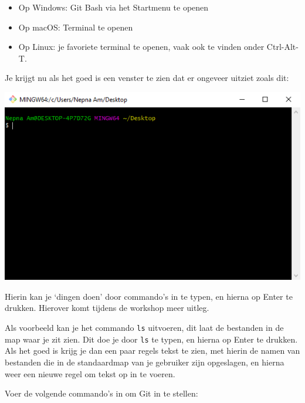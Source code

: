 \documentclass[a4paper]{extarticle}
\begin{document}
\begin{itemize}
	\item Op Windows: Git Bash via het Startmenu te openen
	\item Op macOS: Terminal te openen
	\item Op Linux: je favoriete terminal te openen, vaak ook te vinden onder Ctrl-Alt-T.
\end{itemize}

Je krijgt nu als het goed is een venster te zien dat er ongeveer uitziet zoals dit:
\begin{center}
	\includegraphics[width=0.75\linewidth]{terminal}
\end{center}

Hierin kan je `dingen doen' door commando's in te typen, en hierna op Enter te drukken. Hierover komt tijdens de
workshop meer uitleg.

Als voorbeeld kan je het commando \texttt{ls} uitvoeren, dit laat de bestanden in de map waar je zit zien. Dit doe je
door \texttt{ls} te typen, en hierna op Enter te drukken. Als het goed is krijg je dan een paar regels tekst te zien,
met hierin de namen van bestanden die in de standaardmap van je gebruiker zijn opgeslagen, en hierna weer een nieuwe
regel om tekst op in te voeren.

Voer de volgende commando's in om Git in te stellen:
\end{document}
